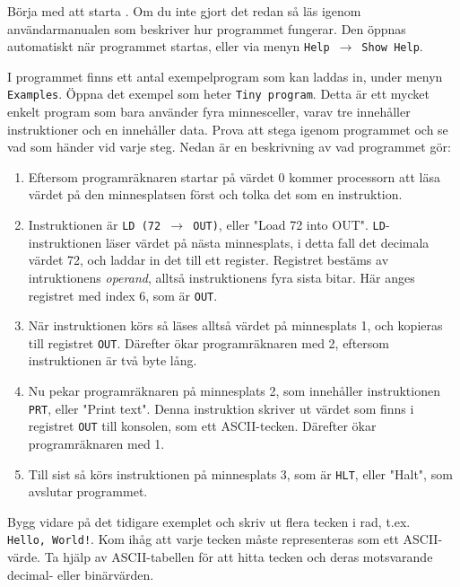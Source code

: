 \begin{Datorarbete}
    \item {} Börja med att starta \progname. Om du inte gjort det redan så läs igenom användarmanualen som beskriver hur programmet fungerar. Den öppnas automatiskt när programmet startas, eller via menyn \texttt{Help}~$\rightarrow$~\texttt{Show Help}.

    \item {} I programmet finns ett antal exempelprogram som kan laddas in, under menyn \texttt{Examples}. Öppna det exempel som heter \texttt{Tiny program}. Detta är ett mycket enkelt program som bara använder fyra minnesceller, varav tre innehåller instruktioner och en innehåller data. Prova att stega igenom programmet och se vad som händer vid varje steg. Nedan är en beskrivning av vad programmet gör:
    \begin{enumerate}
        \item Eftersom programräknaren startar på värdet 0 kommer processorn att läsa värdet på den minnesplatsen först och tolka det som en instruktion.
        \item Instruktionen är \texttt{LD (72 $\rightarrow$ OUT)}, eller "Load 72 into OUT". \texttt{LD}-instruktionen läser värdet på nästa minnesplats, i detta fall det decimala värdet 72, och laddar in det till ett register. Registret bestäms av intruktionens \emph{operand}, alltså instruktionens fyra sista bitar. Här anges registret med index 6, som är \texttt{OUT}.
        \item När instruktionen körs så läses alltså värdet på minnesplats 1, och kopieras till registret \texttt{OUT}. Därefter ökar programräknaren med 2, eftersom instruktionen är två byte lång.
        \item Nu pekar programräknaren på minnesplats 2, som innehåller instruktionen \texttt{PRT}, eller "Print text". Denna instruktion skriver ut värdet som finns i registret \texttt{OUT} till konsolen, som ett ASCII-tecken. Därefter ökar programräknaren med 1.
        \item Till sist så körs instruktionen på minnesplats 3, som är \texttt{HLT}, eller "Halt", som avslutar programmet.
    \end{enumerate}

    \item {} Bygg vidare på det tidigare exemplet och skriv ut flera tecken i rad, t.ex. \texttt{Hello,~World!}. Kom ihåg att varje tecken måste representeras som ett ASCII-värde. Ta hjälp av ASCII-tabellen för att hitta tecken och deras motsvarande decimal- eller binärvärden.


\end{Datorarbete}
